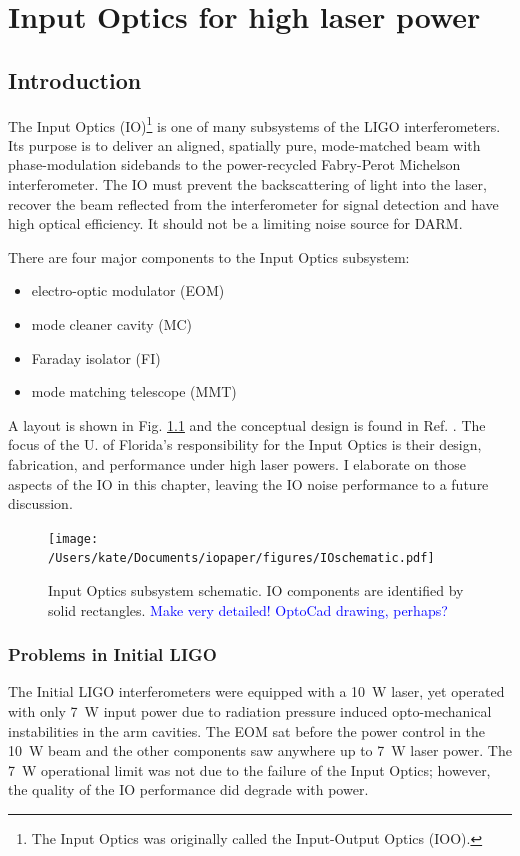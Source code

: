 \chapter{Input Optics for high laser power}%

\section{Introduction}%
The Input Optics (IO)\footnote{The Input Optics was originally called the Input-Output Optics (IOO).} is one of many subsystems of the LIGO interferometers.  Its purpose is to deliver an aligned, spatially pure, mode-matched beam with phase-modulation sidebands to the power-recycled Fabry-Perot Michelson interferometer. The IO must prevent the backscattering of light into the laser, recover the beam reflected from the interferometer for signal detection and have high optical efficiency. It should not be a limiting noise source for DARM. 

There are four major components to the Input Optics subsystem:
\begin{itemize}
\item electro-optic modulator (EOM) \vspace{-10pt}%
\item mode cleaner cavity (MC) \vspace{-10pt}%
\item Faraday isolator (FI) \vspace{-10pt}%
\item mode matching telescope (MMT)
\end{itemize}
A layout is shown in Fig. \ref{fig:IOschematic} and the conceptual design is found in Ref. \cite{Camp1996InputOutput}. The focus of the U. of Florida's responsibility for the Input Optics is their design, fabrication, and performance under high laser powers. I elaborate on those aspects of the IO in this chapter, leaving the IO noise performance to a future discussion. 

\begin{figure}
\begin{centering}
\texttt{[image: /Users/kate/Documents/iopaper/figures/IOschematic.pdf]}
\caption{Input Optics subsystem schematic. IO components are
  identified by solid rectangles. \textcolor{blue}{Make very detailed!
    OptoCad drawing, perhaps?}}
\label{fig:IOschematic}
\end{centering}
\end{figure}

\subsection{Problems in Initial LIGO}
The Initial LIGO interferometers were equipped with a 10~W laser, yet
operated with only 7~W input power due to radiation pressure induced
opto-mechanical instabilities in the arm cavities. The EOM sat
before the power control in the 10~W beam and the other components saw
anywhere up to 7~W laser power. The 7~W operational limit was not due
to the failure of the Input Optics; however, the quality of the IO
performance did degrade with power.

